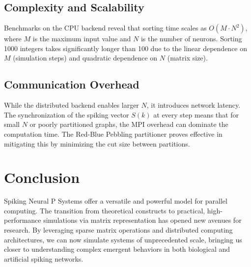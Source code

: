\documentclass[11pt, a4paper]{article}
\begin{document}
\subsection{Complexity and Scalability}
Benchmarks on the CPU backend reveal that sorting time scales as $O(M \cdot N^2)$, where $M$ is the maximum input value and $N$ is the number of neurons. Sorting 1000 integers takes significantly longer than 100 due to the linear dependence on $M$ (simulation steps) and quadratic dependence on $N$ (matrix size).

\subsection{Communication Overhead}
While the distributed backend enables larger $N$, it introduces network latency. The synchronization of the spiking vector $S(k)$ at every step means that for small $N$ or poorly partitioned graphs, the MPI overhead can dominate the computation time. The Red-Blue Pebbling partitioner proves effective in mitigating this by minimizing the cut size between partitions.

\section{Conclusion}
Spiking Neural P Systems offer a versatile and powerful model for parallel computing. The transition from theoretical constructs to practical, high-performance simulations via matrix representation has opened new avenues for research. By leveraging sparse matrix operations and distributed computing architectures, we can now simulate systems of unprecedented scale, bringing us closer to understanding complex emergent behaviors in both biological and artificial spiking networks.
\end{document}
